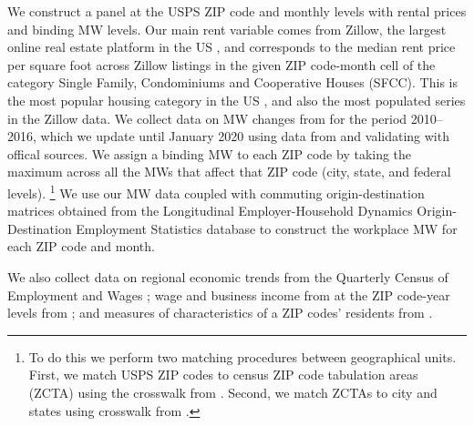 We construct a panel at the USPS ZIP code and monthly levels with rental prices 
and binding MW levels.
Our main rent variable comes from Zillow, the largest online real estate platform 
in the US \parencite{realestateagentpdx, investopedia}, and corresponds to the 
median rent price per square foot across Zillow listings in the given ZIP code-month 
cell of the category Single Family, Condominiums and Cooperative Houses (SFCC).
This is the most popular housing category in the US \parencite{Fernald2020}, 
and also the most populated series in the Zillow data.
We collect data on MW changes from \textcite{VaghulZipperer2016} for the period 
2010--2016, which we update until January 2020 using data from 
\textcite{BerkeleyLaborCenter} and validating with offical sources.
We assign a binding MW to each ZIP code by taking the maximum across all the
MWs that affect that ZIP code (city, state, and federal levels).%
\footnote{To do this we perform two matching procedures between geographical units.
First, we match USPS ZIP codes to census ZIP code tabulation areas (ZCTA) using 
the crosswalk from \textcite{UDSMapper}.
Second, we match ZCTAs to city and states using crosswalk from 
\textcite{MissouriCenter}.}
We use our MW data coupled with commuting origin-destination matrices obtained 
from the Longitudinal Employer-Household Dynamics Origin-Destination Employment 
Statistics \parencite[LODES;][]{LODES} database to construct the workplace MW for 
each ZIP code and month.

We also collect data on 
regional economic trends from the Quarterly Census of Employment and Wages 
\textcite[QCEW;][]{QCEW}; 
wage and business income from at the ZIP code-year levels from \textcite{IRS}; and 
measures of characteristics of a ZIP codes' residents from \textcite{ACS, 
IPUMS_NHGIS}.


